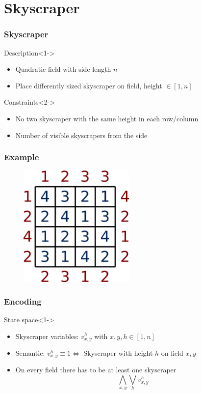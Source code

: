 \section{Skyscraper}

\begin{frame}
	\frametitle{Skyscraper}
	\begin{block}{Description}<1->
		\begin{itemize}
			\item Quadratic field with side length $n$
			\item Place differently sized skyscraper on field, height $\in[1,n]$
		\end{itemize}
	\end{block}
	\begin{block}{Constraints}<2->
		\begin{itemize}
			\item No two skyscraper with the same height in each row/column
			\item Number of visible skyscrapers from the side
		\end{itemize}
	\end{block}
\end{frame}

\begin{frame}
	\frametitle{Example}
	\begin{figure}
		\centering
		\includegraphics[height=6cm]{images/skyscraper.png}
	\end{figure}
\end{frame}

\begin{frame}
	\frametitle{Encoding}
	\begin{block}{State space}<1->
		\begin{itemize}
			\item Skyscraper variables: $v_{x,y}^{h}$ with $x,y,h\in[1,n]$
			\item Semantic: $v_{x,y}^{h} \equiv 1 \Leftrightarrow$ Skyscraper with height $h$ on field $x,y$
		\end{itemize}
	\end{block}
	\begin{itemize}
		\item<2-> On every field there has to be at least one skyscraper
		\begin{displaymath}
			\bigwedge_{x,y} \bigvee_{h} v_{x,y}^h
		\end{displaymath}
	\end{itemize}
\end{frame}


